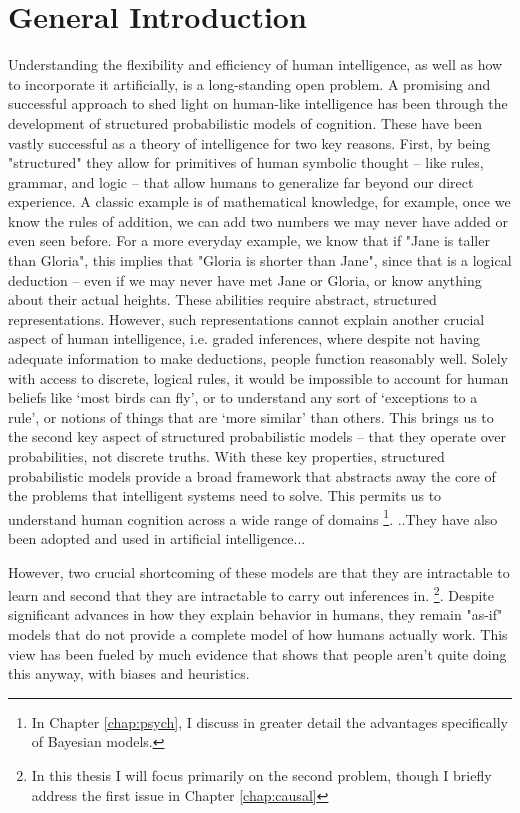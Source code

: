 \chapter{General Introduction}
\label{chap:intro}

Understanding the flexibility and efficiency of human intelligence, as well as how to incorporate it artificially, is a long-standing open problem. A promising and successful approach to shed light on human-like intelligence has been through the development of structured probabilistic models of cognition. These have been vastly successful as a theory of intelligence for two key reasons. First, by being "structured" they allow for primitives of human symbolic thought -- like rules, grammar, and logic -- that allow humans to generalize far beyond our direct experience\cite{fodor88, chomsky2002syntactic}. A classic example is of mathematical knowledge, for example, once we know the rules of addition, we can add two numbers we may never have added or even seen before. For a more everyday example, we know that if "Jane is taller than Gloria", this implies that "Gloria is shorter than Jane", since that is a logical deduction -- even if we may never have met Jane or Gloria, or know anything about their actual heights. These abilities require abstract, structured representations. However, such representations cannot explain another crucial aspect of human intelligence, i.e. graded inferences\cite{rogers2004semantic}, where despite not having adequate information to make deductions, people function reasonably well. Solely with access to discrete, logical rules, it would be impossible to account for human beliefs like `most birds can fly', or to understand any sort of `exceptions to a rule', or notions of things that are `more similar' than others. This brings us to the second key aspect of structured probabilistic models -- that they operate over probabilities, not discrete truths. With these key properties, structured probabilistic models provide a broad  framework that abstracts away the core of the problems that intelligent systems need to solve. This permits us to understand human cognition across a wide range of domains \footnote{In Chapter \ref{chap:psych}, I discuss in greater detail the advantages specifically of Bayesian models.}. ..They have also been adopted and used in artificial intelligence... 

However, two crucial shortcoming of these models are that they are intractable to learn and second that they are intractable to carry out inferences in. \footnote{In this thesis I will focus primarily on the second problem, though I briefly address the first issue in Chapter \ref{chap:causal}}. Despite significant advances in how they explain behavior in humans, they remain "as-if" models that do not provide a complete model of how humans actually work. This view has been fueled by much evidence that shows that people aren't quite doing this anyway, with biases and heuristics. 

